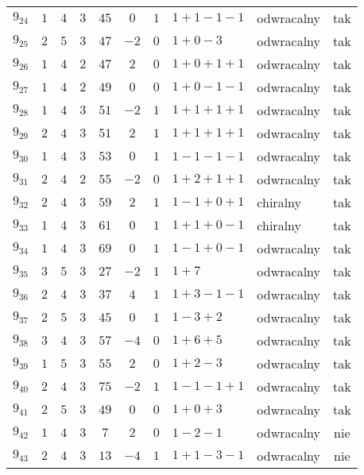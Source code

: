 \begin{longtable}{lccccccllc}
$9_{24}$   & $1$   & $4$ & $3$ & $45$  & $0$  & $1$ & $1+1-1-1$     & odwracalny & tak \\
$9_{25}$   & $2$   & $5$ & $3$ & $47$  & $-2$ & $0$ & $1+0-3$       & odwracalny & tak \\
$9_{26}$   & $1$   & $4$ & $2$ & $47$  & $2$  & $0$ & $1+0+1+1$     & odwracalny & tak \\
$9_{27}$   & $1$   & $4$ & $2$ & $49$  & $0$  & $0$ & $1+0-1-1$     & odwracalny & tak \\
$9_{28}$   & $1$   & $4$ & $3$ & $51$  & $-2$ & $1$ & $1+1+1+1$     & odwracalny & tak \\
$9_{29}$   & $2$   & $4$ & $3$ & $51$  & $2$  & $1$ & $1+1+1+1$     & odwracalny & tak \\
$9_{30}$   & $1$   & $4$ & $3$ & $53$  & $0$  & $1$ & $1-1-1-1$     & odwracalny & tak \\
$9_{31}$   & $2$   & $4$ & $2$ & $55$  & $-2$ & $0$ & $1+2+1+1$     & odwracalny & tak \\
$9_{32}$   & $2$   & $4$ & $3$ & $59$  & $2$  & $1$ & $1-1+0+1$     & chiralny   & tak \\
$9_{33}$   & $1$   & $4$ & $3$ & $61$  & $0$  & $1$ & $1+1+0-1$     & chiralny   & tak \\
$9_{34}$   & $1$   & $4$ & $3$ & $69$  & $0$  & $1$ & $1-1+0-1$     & odwracalny & tak \\
$9_{35}$   & $3$   & $5$ & $3$ & $27$  & $-2$ & $1$ & $1+7$         & odwracalny & tak \\
$9_{36}$   & $2$   & $4$ & $3$ & $37$  & $4$  & $1$ & $1+3-1-1$     & odwracalny & tak \\
$9_{37}$   & $2$   & $5$ & $3$ & $45$  & $0$  & $1$ & $1-3+2$       & odwracalny & tak \\
$9_{38}$   & $3$   & $4$ & $3$ & $57$  & $-4$ & $0$ & $1+6+5$       & odwracalny & tak \\
$9_{39}$   & $1$   & $5$ & $3$ & $55$  & $2$  & $0$ & $1+2-3$       & odwracalny & tak \\
$9_{40}$   & $2$   & $4$ & $3$ & $75$  & $-2$ & $1$ & $1-1-1+1$     & odwracalny & tak \\
$9_{41}$   & $2$   & $5$ & $3$ & $49$  & $0$  & $0$ & $1+0+3$       & odwracalny & tak \\
$9_{42}$   & $1$   & $4$ & $3$ & $7$   & $2$  & $0$ & $1-2-1$       & odwracalny & nie \\
$9_{43}$   & $2$   & $4$ & $3$ & $13$  & $-4$ & $1$ & $1+1-3-1$     & odwracalny & nie \\

\end{longtable}
